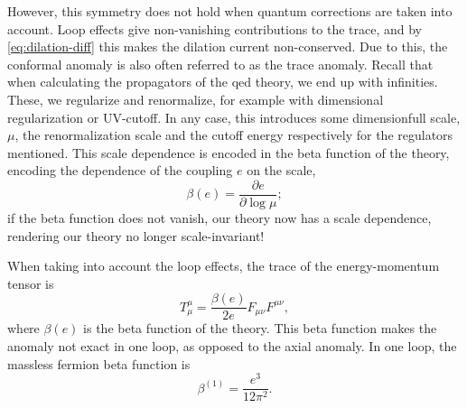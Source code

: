 However, this symmetry does not hold when quantum corrections are taken into account.
Loop effects give non-vanishing contributions to the trace, and by \cref{eq:dilation-diff} this makes the dilation current non-conserved.
Due to this, the conformal anomaly is also often referred to as the trace anomaly.
Recall that when calculating the propagators of the \gls{qed} theory, we end up with infinities.
These, we regularize and renormalize, for example with dimensional regularization or UV-cutoff.
In any case, this introduces some dimensionfull scale, $\mu $, the renormalization scale and the cutoff energy respectively for the regulators mentioned.
This scale dependence is encoded in the beta function of the theory, encoding the dependence of the coupling $e$ on the scale,
\begin{equation}
  \beta (e) = \frac{\partial e}{\partial \log \mu };
\end{equation}
if the beta function does not vanish, our theory now has a scale dependence, rendering our theory no longer scale-invariant!


When taking into account the loop effects, the trace of the energy-momentum tensor is~\cite{kachelriessQuantumFieldsHubble2018}
\begin{equation}
  T_{\mu }^{\mu } = \frac{\beta (e)}{2 e} F_{\mu \nu }F^{\mu \nu },
\end{equation}
where $\beta (e)$ is the beta function of the theory.
This beta function makes the anomaly not exact in one loop, as opposed to the axial anomaly.
In one loop, the massless fermion beta function is~\cite{chernodubAnomalousTransportDue2016}
\begin{equation}
  \label{eq:beta-function}
  \beta ^{(1)} = \frac{e^3}{12 \pi^2}.
\end{equation}

